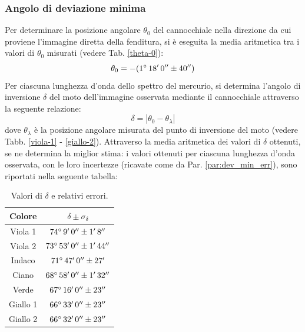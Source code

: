 \documentclass[]{article}
\begin{document}
    \subsubsection{Angolo di deviazione minima}
    Per determinare la posizione angolare $\theta_0$ del cannocchiale nella direzione da cui proviene l'immagine diretta della fenditura, si è eseguita la media aritmetica tra i valori di $\theta_0$ misurati (vedere Tab. \ref{theta-0}):
    \begin{equation}
        \label{theta-0-eq}
        \theta_0 = -(1 \degree \, 18' \, 0'' \pm 40'') 
    \end{equation}
    Per ciascuna lunghezza d'onda dello spettro del mercurio, si determina l'angolo di inversione $\delta$ del moto dell'immagine osservata mediante il cannocchiale attraverso la seguente relazione:
    \begin{equation}
        \label{delta}
        \delta = | \theta_0 - \theta_{\lambda}|
    \end{equation}
    dove $\theta_{\lambda}$ è la posizione angolare misurata del punto di inversione del moto (vedere Tabb. \ref{viola-1} - \ref{giallo-2}).
    Attraverso la media aritmetica dei valori di $\delta$ ottenuti, se ne determina la miglior stima: i valori ottenuti per ciascuna lunghezza d'onda osservata, con le loro incertezze (ricavate come da Par. \ref{par:dev_min_err}), sono riportati nella seguente tabella:
    \begin{table} [H]
        \centering
        \begin{tabular}{||c|c||}
            \hline
            Colore & $\delta \pm \sigma_{\delta}$\\
            \hline \hline
            Viola 1  & $ 74 \degree \,  9' \, 0'' \pm  1' \,  8'' $ \\\hline
            Viola 2  & $ 73 \degree \, 53' \, 0'' \pm  1' \, 44'' $ \\\hline
            Indaco   & $ 71 \degree \, 47' \, 0'' \pm 27'         $ \\\hline
            Ciano    & $ 68 \degree \, 58' \, 0'' \pm  1' \, 32'' $ \\\hline
            Verde    & $ 67 \degree \, 16' \, 0'' \pm        23'' $ \\\hline
            Giallo 1 & $ 66 \degree \, 33' \, 0'' \pm        23'' $ \\\hline
            Giallo 2 & $ 66 \degree \, 32' \, 0'' \pm        23'' $ \\\hline
        \end{tabular}
        \caption{Valori di $\delta$ e relativi errori.}
        \label{d-values}
    \end{table}
\end{document}
